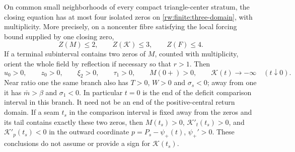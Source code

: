 \begin{proposition}
\label{rw:finite:three-count}
On common small neighborhoods of every compact triangle-center
stratum, the closing equation has at most four isolated zeros on
\eqref{rw:finite:three-domain}, with multiplicity.
More precisely, on a noncenter fibre satisfying the local forcing
bound supplied by one closing zero,
\[
 Z(M)\le2,\qquad Z(\mathcal K)\le3,\qquad Z(F)\le4.
\]
If a terminal subinterval contains two zeros of $M$, counted with
multiplicity, orient the whole field by reflection if necessary so
that $r>1$. Then
\begin{equation}\label{rw:finite:three-terminal-signs}
 u_0>0,\qquad z_0>0,\qquad \xi_2>0,\qquad \tau_1>0,
 \qquad M(0+)>0,\qquad
 \mathcal K(t)\longrightarrow-\infty\quad(t\downarrow0).
\end{equation}
Near ratio one the same branch also has $T>0$, $W>0$ and
$\sigma_s<0$; away from one it has $\bar m>\beta$ and
$\sigma_1<0$. In particular $t=0$ is the end of the deficit
comparison interval in this branch. It need not be an end of the
positive-central return domain. If a seam $t_s$ in the comparison interval
is fixed away from the zeros and its tail contains exactly these two
zeros, then $M(t_s)>0$, $\mathcal K'_t(t_s)>0$, and
$\mathcal K'_p(t_s)<0$ in the outward coordinate
$p=P_s-\psi_+(t)$, $\psi_+'>0$.
These conclusions do not assume or provide a sign for
$\mathcal K(t_s)$.
\end{proposition}

